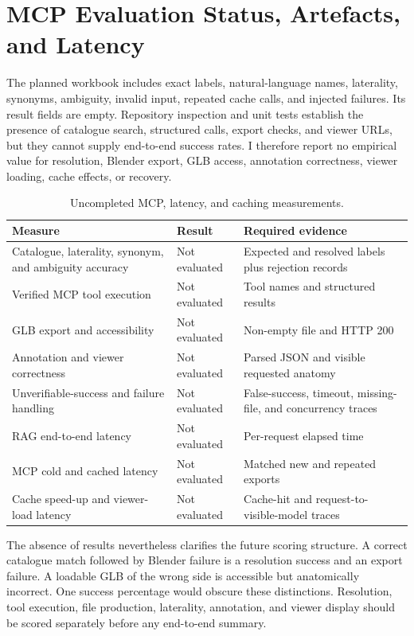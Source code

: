 \section{MCP Evaluation Status, Artefacts, and Latency}
\label{sec:mcp-results}

The planned \MCP{} workbook includes exact labels, natural-language names, laterality, synonyms, ambiguity, invalid input, repeated cache calls, and injected failures. Its result fields are empty. Repository inspection and unit tests establish the presence of catalogue search, structured calls, export checks, and viewer URLs, but they cannot supply end-to-end success rates. I therefore report no empirical value for resolution, Blender export, GLB access, annotation correctness, viewer loading, cache effects, or recovery.

\begin{table}[htbp]
  \centering
  \caption{Uncompleted MCP, latency, and caching measurements.}
  \label{tab:mcp-results}
  \scriptsize
  \begin{tabularx}{\textwidth}{L{0.35\textwidth}L{0.23\textwidth}Y}
    \toprule
    Measure & Result & Required evidence \\
    \midrule
    Catalogue, laterality, synonym, and ambiguity accuracy & Not evaluated & Expected and resolved labels plus rejection records \\
    Verified MCP tool execution & Not evaluated & Tool names and structured results \\
    GLB export and accessibility & Not evaluated & Non-empty file and HTTP 200 \\
    Annotation and viewer correctness & Not evaluated & Parsed JSON and visible requested anatomy \\
    Unverifiable-success and failure handling & Not evaluated & False-success, timeout, missing-file, and concurrency traces \\
    RAG end-to-end latency & Not evaluated & Per-request elapsed time \\
    MCP cold and cached latency & Not evaluated & Matched new and repeated exports \\
    Cache speed-up and viewer-load latency & Not evaluated & Cache-hit and request-to-visible-model traces \\
    \bottomrule
  \end{tabularx}
\end{table}

The absence of results nevertheless clarifies the future scoring structure. A correct catalogue match followed by Blender failure is a resolution success and an export failure. A loadable GLB of the wrong side is accessible but anatomically incorrect. One success percentage would obscure these distinctions. Resolution, tool execution, file production, laterality, annotation, and viewer display should be scored separately before any end-to-end summary.

